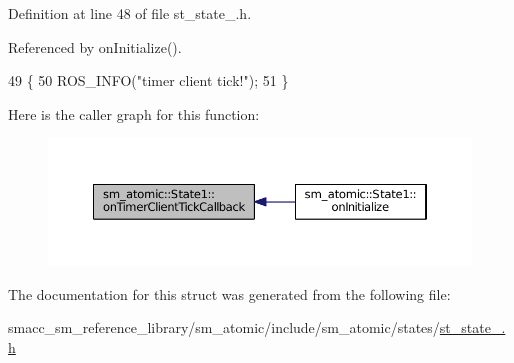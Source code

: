 Definition at line 48 of file st\+\_\+state\+\_.\+h.



Referenced by on\+Initialize().


\begin{DoxyCode}
49     \{
50         ROS\_INFO(\textcolor{stringliteral}{"timer client tick!"});
51     \}
\end{DoxyCode}


Here is the caller graph for this function\+:
\nopagebreak
\begin{figure}[H]
\begin{center}
\leavevmode
\includegraphics[width=350pt]{structsm__atomic_1_1State1_adea28f0a0fcedb210a29656f53aeee09_icgraph}
\end{center}
\end{figure}




The documentation for this struct was generated from the following file\+:\begin{DoxyCompactItemize}
\item 
smacc\+\_\+sm\+\_\+reference\+\_\+library/sm\+\_\+atomic/include/sm\+\_\+atomic/states/\hyperlink{sm__atomic_2include_2sm__atomic_2states_2st__state__1_8h}{st\+\_\+state\+\_.\+h}\end{DoxyCompactItemize}
